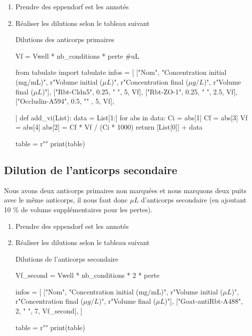 \begin{enumerate}
\item Prendre des eppendorf est les annotés
\item Réaliser les dilutions selon le tableau suivant

\begin{table}[h!]
\caption{Dilutions des anticorps primaires}
\begin{pycode}

Vf = Vwell * nb_conditions * perte #uL

from tabulate import tabulate
infos = [
    ["Nom", "Concentration initial (mg/mL)", r"Volume initial ($\mu L$)", r"Concentration final ($\mu g    /L$)", r"Volume final ($\mu L$)"],
    ["Rbt-Cldn5", 0.25, " ", 5, Vf],
    ["Rbt-ZO-1", 0.25, " ", 2.5, Vf],
    ["Occludin-A594", 0.5, "" , 5, Vf],

]
def add_vi(List):
    data = List[1:]
    for abs in data:
        Ci = abs[1]
        Cf = abs[3]
        Vf = abs[4]
        abs[2] = Cf * Vf / (Ci * 1000)
    return [List[0]] + data



table = r""
print(table)
\end{pycode}
\label{table-dilution-abs-primaire}
\end{table}
\end{enumerate}

\subsection{Dilution de l'anticorps secondaire}
\label{dilution-abs-primaire}
Nous avons deux anticorps primaires non marquées et nous marquons deux puits avec le même anticorps, il nous faut donc  $\mu L$ d'anticorps secondaire (en ajoutant 10 \% de volume supplémentaires pour les pertes). 

\begin{enumerate}
\item Prendre des eppendorf est les annotés
\item Réaliser les dilutions selon le tableau suivant

\begin{table}[h!]
\caption{Dilutions de l'anticorps secondaire}
\begin{pycode}

Vf_second = Vwell * nb_conditions * 2 * perte

infos = [
    ["Nom", "Concentration initial (mg/mL)", r"Volume initial ($\mu L$)", r"Concentration final ($\mu g    /L$)", r"Volume final ($\mu L$)"],
    ["Goat-antiRbt-A488", 2, " ", 7, Vf_second],
]

table = r""
print(table)
\end{pycode}
\label{table-dilution-abs-secondaire}
\end{table}
\end{enumerate}

